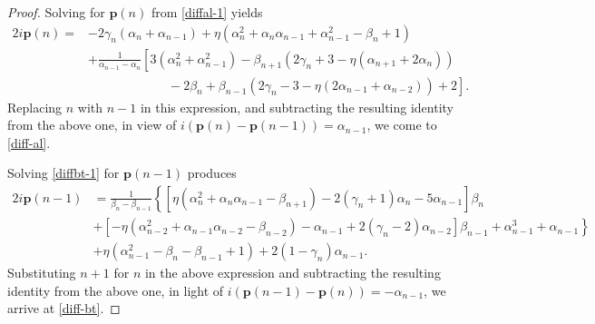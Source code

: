 \documentclass[10pt,a4paper]{amsart}
\begin{document}
	\begin{proof}
Solving for $\textbf{p}(n)$ from \eqref{diffal-1} yields
\begin{align*}
2\mathit{i}\textbf{p}(n)=&-2\gamma_n(\alpha_n+\alpha_{n-1})+\eta(\alpha_n^2+\alpha_n\alpha_{n-1}+\alpha_{n-1}^2-\beta_n+1)\\
&+\frac{1}{\alpha_{n-1}-\alpha_{n}}\left[3\left(\alpha_{n}^2+\alpha_{n-1}^2\right)-\beta_{n+1}\left(2\gamma_n+3-\eta(\alpha_{n+1}+2\alpha_{n})\right)\right.\\
&\left.\qquad\qquad\qquad\;-2\beta_n+\beta_{n-1}\left(2\gamma_n-3-\eta( 2\alpha_{n-1}+\alpha_{n-2})\right)+2\right].
\end{align*}
Replacing $n$ with $n-1$ in this expression, and subtracting the resulting identity from the above one, in view of $\mathit{i}(\textbf{p}(n)-\textbf{p}(n-1))=\alpha_{n-1}$, we come to \eqref{diff-al}.

Solving \eqref{diffbt-1} for $\textbf{p}(n-1)$  produces
\begin{equation*}
\begin{aligned}		 2\mathit{i}\textbf{p}(n-1)&=\frac{1}{\beta_{n}-\beta_{n-1}}\left\{\left[\eta(\alpha_{n}^2+\alpha_{n}\alpha_{n-1}-\beta_{n+1})-2(\gamma_n+1)\alpha_{n}-5\alpha_{n-1}\right]\beta_{n}\right.\\ &\left.+\left[-\eta(\alpha_{n-2}^2+\alpha_{n-1}\alpha_{n-2}-\beta_{n-2})-\alpha_{n-1}+2(\gamma_n-2)\alpha_{n-2}\right]\beta_{n-1}+\alpha_{n-1}^3+\alpha_{n-1}\right\}\\ &+\eta(\alpha_{n-1}^2-\beta_{n}-\beta_{n-1}+1)+2(1-\gamma_n)\alpha_{n-1}.\label{(1.14)}
	\end{aligned}
\end{equation*}
Substituting $n+1$ for $n$ in the above expression and subtracting  the resulting identity from the above one,  in light of $\mathit{i}(\textbf{p}(n-1)-\textbf{p}(n))=-\alpha_{n-1}$, we arrive at \eqref{diff-bt}.
\end{proof}
\end{document}
